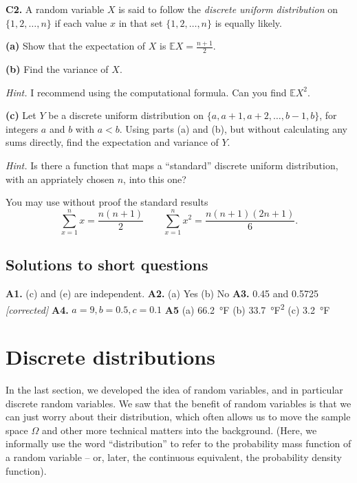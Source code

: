 \documentclass[
  a4paper,
]{book}
\theoremstyle{definition}
\theoremstyle{definition}
\theoremstyle{definition}
\theoremstyle{definition}
\theoremstyle{remark}
\begin{document}
\textbf{C2.} A random variable \(X\) is said to follow the \emph{discrete uniform distribution} on \(\{1, 2, \dots, n\}\) if each value \(x\) in that set \(\{1,2,\dots,n\}\) is equally likely.

\textbf{(a)} Show that the expectation of \(X\) is \(\mathbb EX = \displaystyle\frac{n+1}{2}\).

\textbf{(b)} Find the variance of \(X\).

\begin{myanswers}
\emph{Hint.} I recommend using the computational formula. Can you find \(\mathbb EX^2\).

\end{myanswers}

\textbf{(c)} Let \(Y\) be a discrete uniform distribution on \(\{a, a+1, a+2, \dots, b-1, b\}\), for integers \(a\) and \(b\) with \(a<b\). Using parts (a) and (b), but without calculating any sums directly, find the expectation and variance of \(Y\).

\begin{myanswers}
\emph{Hint.} Is there a function that maps a ``standard'' discrete uniform distribution, with an appriately chosen \(n\), into this one?

\end{myanswers}

You may use without proof the standard results
\[ \sum_{x=1}^n x = \frac{n(n+1)}{2} \qquad  \sum_{x=1}^n x^2 = \frac{n(n+1)(2n+1)}{6} . \]

\hypertarget{P3-short-sols}{%
\section*{Solutions to short questions}\label{P3-short-sols}}

\textbf{A1.} (c) and (e) are independent. \textbf{A2.} (a) Yes (b) No \textbf{A3.} 0.45 and 0.5725 \emph{{[}corrected{]}} \textbf{A4.} \(a = 9, b = 0.5, c = 0.1\) \textbf{A5} (a) 66.2~°F (b) 33.7~°F\textsuperscript{2} (c) 3.2~°F

\hypertarget{S06-discrete-dist}{%
\chapter{Discrete distributions}\label{S06-discrete-dist}}

In the last section, we developed the idea of random variables, and in particular discrete random variables. We saw that the benefit of random variables is that we can just worry about their distribution, which often allows us to move the sample space \(\Omega\) and other more technical matters into the background. (Here, we informally use the word ``distribution'' to refer to the probability mass function of a random variable -- or, later, the continuous equivalent, the probability density function).
\end{document}
